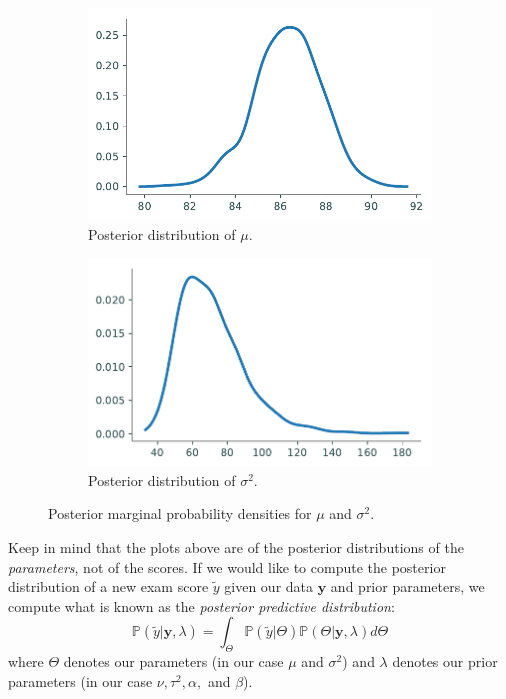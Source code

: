 \begin{figure}[H]
    \begin{subfigure}[b]{.49\textwidth}
        \includegraphics[width=\textwidth]{figures/mu_posterior.pdf}
        \caption{Posterior distribution of $\mu$.}
    \end{subfigure}
    \begin{subfigure}[b]{.49\textwidth}
        \includegraphics[width=\textwidth]{figures/sigma2_posterior.pdf}
        \caption{Posterior distribution of $\sigma^2$.}
    \end{subfigure}
\caption{Posterior marginal probability densities for $\mu$ and $\sigma^2$.}
\label{fig:post}
\end{figure}

Keep in mind that the plots above are of the posterior distributions of the \emph{parameters}, not of the scores. If we would like to compute the posterior distribution of a new exam score $\tilde{y}$ given our data $\mathbf{y}$ and prior parameters, we compute what is known as the \emph{posterior predictive distribution}:
\begin{equation*}
\mathbb{P}(\tilde{y} | \mathbf{y}, \lambda) = \int_{\Theta} \mathbb{P}(\tilde{y} | \Theta)\mathbb{P}(\Theta | \mathbf{y}, \lambda) d\Theta
\end{equation*}
where $\Theta$ denotes our parameters (in our case $\mu$ and $\sigma^{2}$) and $\lambda$ denotes our prior parameters (in our case $\nu, \tau^{2}, \alpha,$ and $\beta$).

